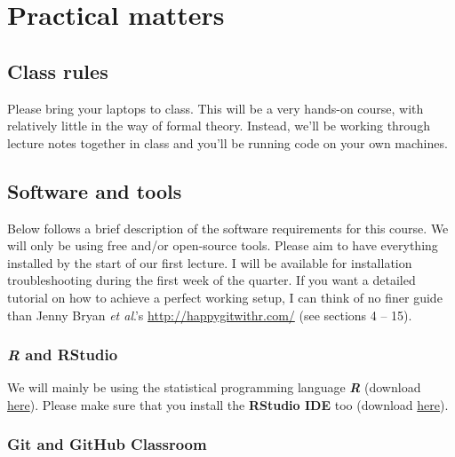 \documentclass[12]{article}
\begin{document}
\newpage

\section*{Practical matters}

\subsection*{Class rules}

Please bring your laptops to class. This will be a very hands-on course, with relatively little in the way of formal theory. Instead, we'll be working through lecture notes together in class and you'll be running code on your own machines. 

\subsection*{Software and tools}

Below follows a brief description of the software requirements for this course. We will only be using free and/or open-source tools. Please aim to have everything installed by the start of our first lecture. I will be available for installation troubleshooting during the first week of the quarter. If you want a detailed tutorial on how to achieve a perfect working setup, I can think of no finer guide than Jenny Bryan \textit{et al}.'s \url{http://happygitwithr.com/} (see sections 4 -- 15).

\vspace{-0.25cm}
\subsubsection*{\textit{R} and RStudio}

We will mainly be using the statistical programming language \textbf{\textit{R}} (download \href{https://www.r-project.org/}{here}). %
Please make sure that you install the \textbf{RStudio IDE} too (download \href{https://www.rstudio.com/products/rstudio/download/preview/}{here}).

\vspace{-0.25cm}
\subsubsection*{Git and GitHub Classroom}
\end{document}
